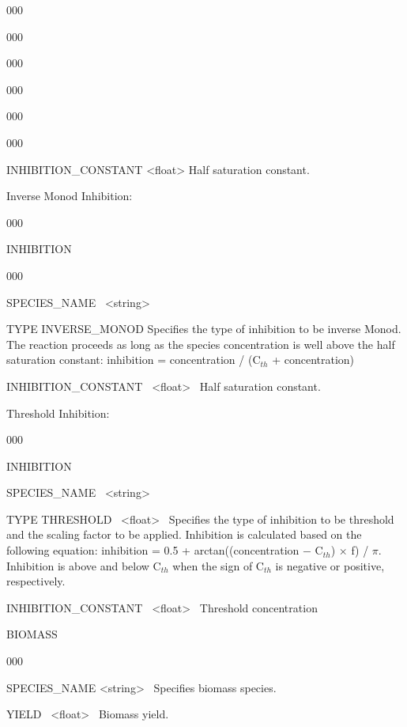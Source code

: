 \begin{deflist}{000}
\begin{deflist}{000}
\begin{deflist}{000}
\begin{deflist}{000}
\begin{deflist}{000}
\begin{deflist}{000}
        \item [INHIBITION\_CONSTANT] <float> Half saturation constant.
      \end{deflist}
    \end{deflist}
 
    \item [Inverse Monod Inhibition:] ~

    \begin{deflist}{000}
      \item [INHIBITION] ~

      \begin{deflist}{000}
         \item [SPECIES\_NAME] \ <string>

         \item [TYPE INVERSE\_MONOD] Specifies the type of inhibition to be inverse Monod. The reaction proceeds as long as the species concentration is well above the half saturation constant: inhibition = concentration / (C$_{th}$ + concentration)

        \item [INHIBITION\_CONSTANT] \ <float> \ Half saturation constant.

      \end{deflist}
    \end{deflist}

\item [Threshold Inhibition:] ~ %
\begin{deflist}{000}
\item [INHIBITION] ~
\item [SPECIES\_NAME] \ <string>

\item [TYPE THRESHOLD] \ <float> \ 
Specifies the type of inhibition to be threshold and the scaling factor to be applied. Inhibition is calculated based on the following equation: inhibition = 0.5 + arctan((concentration $-$ C$_{th}$) $\times$ f) / $\pi$. Inhibition is above and below C$_{th}$ when the sign of C$_{th}$ is negative or positive, respectively.

\item [INHIBITION\_CONSTANT] \ <float> \ Threshold concentration
\end{deflist}
\end{deflist}
\item[\keyend]
\item [BIOMASS] ~
\begin{deflist}{000}
\item [SPECIES\_NAME]  <string> \ Specifies biomass species.
\item [YIELD] \ <float> \  Biomass yield.
\end{deflist}
\item[\keyend]
\end{deflist}
\item[\keyend]
\end{deflist}


\end{deflist}
